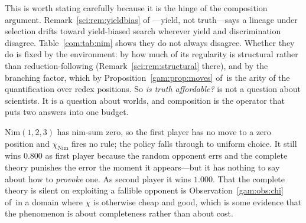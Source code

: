 This is worth stating carefully because it is the hinge of the composition argument. Remark~\ref{sci:rem:yieldbias} of
\chSci---yield, not truth---says a lineage under selection drifts toward yield-biased
search wherever yield and discrimination disagree. Table~\ref{com:tab:nim} shows they do not always
disagree. Whether they do is fixed by the environment: by how much of its regularity is
structural rather than reduction-following (Remark~\ref{sci:rem:structural} there), and by the branching factor, which
by Proposition~\ref{gam:prop:moves} of~\chGame is the arity of the quantification over redex positions. So
\emph{is truth affordable?} is not a question about scientists. It is a question about worlds, and
composition is the operator that puts two answers into one budget.

\begin{remark}\label{com:lost-position-fall-through}
Nim$(1,2,3)$ has nim-sum zero, so the first player has no move to a zero position and
$\chi_{\mathrm{Nim}}$ fires no rule; the policy falls through to uniform choice. It still wins
$0.800$ as first player because the random opponent errs and the complete theory punishes the
error the moment it appears---but it has nothing to say about how to \emph{provoke} one. As
second player it wins $1.000$. That the complete theory is silent on exploiting a fallible
opponent is Observation~\ref{gam:obs:chi} of~\chGame in a domain where $\chi$ is otherwise cheap and good,
which is some evidence that the phenomenon is about completeness rather than about cost.
\end{remark}

